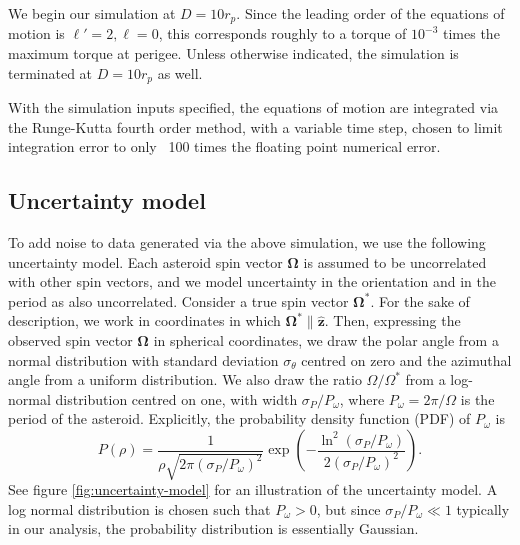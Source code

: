 \documentclass[fleqn,usenatbib]{mnras}
\renewcommand{\unit}[1]{\bm{\hat{#1}}}
\newcommand{\parens}[1]{\left( #1 \right)}
\newcommand{\brackets}[1]{\left[ #1 \right]}
\begin{document}
We begin our simulation at $D = 10 r_p$. Since the leading order of the equations of motion is $\ell' = 2, \ell = 0$, this corresponds roughly to a torque of $10^{-3}$ times the maximum torque at perigee. Unless otherwise indicated, the simulation is terminated at $D=10 r_p$ as well.

With the simulation inputs specified, the equations of motion are integrated via the Runge-Kutta fourth order method, with a variable time step, chosen to limit integration error to only ~100 times the floating point numerical error.



\subsection{Uncertainty model}
\label{sec:uncertainty}

To add noise to data generated via the above simulation, we use the following uncertainty model. Each asteroid spin vector $\bm \Omega$ is assumed to be uncorrelated with other spin vectors, and we model uncertainty in the orientation and in the period as also uncorrelated. Consider a true spin vector $\bm \Omega^*$. For the sake of description, we work in coordinates in which $\bm \Omega^* \parallel \unit z$. Then, expressing the observed spin vector $\bm \Omega$ in spherical coordinates, we draw the polar angle from a normal distribution with standard deviation $\sigma_\theta$ centred on zero and the azimuthal angle from a uniform distribution. We also draw the ratio $\Omega/\Omega^*$ from a log-normal distribution centred on one, with width $\sigma_P / P_\omega$, where $P_\omega = 2\pi / \Omega$ is the period of the asteroid. Explicitly, the probability density function (PDF) of $P_\omega$ is 
\begin{equation}
  P(\rho) = \frac{1}{\rho\sqrt{2\pi (\sigma_P / P_\omega)^2}} \exp\parens{-\frac{\ln^2(\sigma_P / P_\omega)}{2(\sigma_P / P_\omega)^2}}.
\end{equation}
See figure \ref{fig:uncertainty-model} for an illustration of the uncertainty model. A log normal distribution is chosen such that $P_\omega > 0$, but since $\sigma_P/P_\omega \ll 1$ typically in our analysis, the probability distribution is essentially Gaussian.
\end{document}
